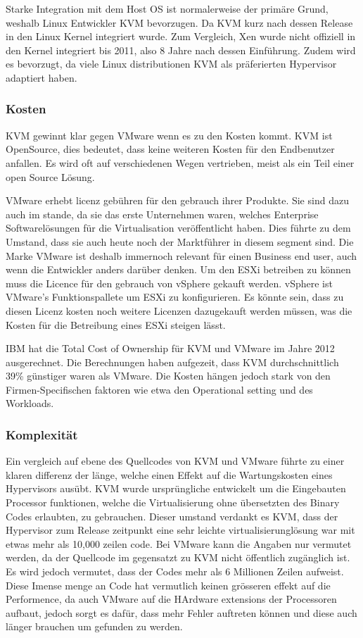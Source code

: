 \documentclass[14pt]{extreport}
\begin{document}
Starke Integration mit dem Host OS ist normalerweise der primäre Grund, weshalb Linux Entwickler KVM bevorzugen. Da KVM kurz nach dessen Release in den Linux Kernel integriert wurde. Zum Vergleich, Xen wurde nicht offiziell in den Kernel integriert bis 2011, also 8 Jahre nach dessen Einführung. Zudem wird es bevorzugt, da viele Linux distributionen KVM als präferierten Hypervisor adaptiert haben.

\subsubsection{Kosten}

KVM gewinnt klar gegen VMware wenn es zu den Kosten kommt. KVM ist OpenSource, dies bedeutet, dass keine weiteren Kosten für den Endbenutzer anfallen. Es wird oft auf verschiedenen Wegen vertrieben, meist als ein Teil einer open Source Lösung.

VMware erhebt licenz gebühren für den gebrauch ihrer Produkte. Sie sind dazu auch im stande, da sie das erste Unternehmen waren, welches Enterprise Softwarelösungen für die Virtualisation veröffentlicht haben. Dies führte zu dem Umstand, dass sie auch heute noch der Marktführer in diesem segment sind. Die Marke VMware ist deshalb immernoch relevant für einen Business end user, auch wenn die Entwickler anders darüber denken. Um den ESXi betreiben zu können muss die Licence für den gebrauch von vSphere gekauft werden. vSphere ist VMware's Funktionspallete um ESXi zu konfigurieren. Es könnte sein, dass zu diesen Licenz kosten noch weitere Licenzen dazugekauft werden müssen, was die Kosten für die Betreibung eines ESXi steigen lässt.

IBM hat die Total Cost of Ownership für KVM und VMware im Jahre 2012 ausgerechnet. Die Berechnungen haben aufgezeit, dass KVM durchschnittlich 39\% günstiger waren als VMware. Die Kosten hängen jedoch stark von den Firmen-Specifischen faktoren wie etwa den Operational setting und des Workloads.

\subsubsection{Komplexität}

Ein vergleich auf ebene des Quellcodes von KVM und VMware führte zu einer klaren differenz der länge, welche einen Effekt auf die Wartungskosten eines Hypervisors ausübt. KVM wurde ursprüngliche entwickelt um die Eingebauten Processor funktionen, welche die Virtualisierung ohne übersetzten des Binary Codes erlaubten, zu gebrauchen. Dieser umstand verdankt es KVM, dass der Hypervisor zum Release zeitpunkt eine sehr leichte virtualisierunglösung war mit etwas mehr als 10,000 zeilen code.
Bei VMware kann die Angaben nur vermutet werden, da der Quellcode im gegensatzt zu KVM nicht öffentlich zugänglich ist. Es wird jedoch vermutet, dass der Codes mehr als 6 Millionen Zeilen aufweist. Diese Imense menge an Code hat vermutlich keinen grösseren effekt auf die Performence, da auch VMware auf die HArdware extensions der Processoren aufbaut, jedoch sorgt es dafür, dass mehr Fehler auftreten können und diese auch länger brauchen um gefunden zu werden.
\end{document}
